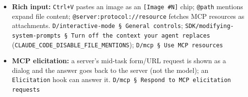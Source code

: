 \begin{itemize}
\item \textbf{Rich input:} \texttt{Ctrl+V} pastes an image as an \texttt{[Image \#N]} chip; \texttt{@path} mentions expand file content; \texttt{@server:\allowbreak{}protocol:\allowbreak{}/\allowbreak{}/\allowbreak{}resource} fetches MCP resources as attachments. \texttt{D/\allowbreak{}interactive-\allowbreak{}mode § General controls}; \texttt{SDK/\allowbreak{}modifying-\allowbreak{}system-\allowbreak{}prompts § Turn off the context your agent replaces} (\texttt{CLAUDE\_\allowbreak{}CODE\_\allowbreak{}DISABLE\_\allowbreak{}FILE\_\allowbreak{}MENTIONS}); \texttt{D/\allowbreak{}mcp § Use MCP resources}
\item \textbf{MCP elicitation:} a server's mid-task form/URL request is shown as a dialog and the answer goes back to the server (not the model); an \texttt{Elicitation} hook can answer it. \texttt{D/\allowbreak{}mcp § Respond to MCP elicitation requests}
\end{itemize}

